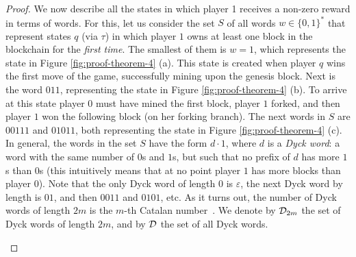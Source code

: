 \begin{proof}
We now describe all the states in which player 1 receives a non-zero reward in terms of words. For this, let us consider the set $S$ of all words $w \in \{0,1\}^*$ that represent states $q$ (via $\tau$) in which player $1$ owns at least one block in the blockchain for the {\em first time}. 
The smallest of them is $w = 1$, which represents the state in Figure \ref{fig:proof-theorem-4} (a). This state is created when player $q$ wins the first move of the game, successfully mining upon the genesis block. Next is the word $011$, representing the state in Figure \ref{fig:proof-theorem-4} (b). To arrive at this state player $0$ must have mined the first block, player $1$ forked, and then player $1$ 
won the following block (on her forking branch). The next words in $S$ are $00111$ and $01011$, both representing the state in Figure \ref{fig:proof-theorem-4} (c). 
In general, the words in the set $S$ have the form $d\cdot 1$, where $d$ is a \emph{Dyck word}: a word with the same number of $0$s and $1$s, but such that 
no prefix of $d$ has more $1$s than $0$s (this intuitively means that at no point player $1$ has more blocks than player $0$). Note that the only Dyck word of length $0$ is $\varepsilon$, the next Dyck word by length is $01$, and then $0011$ and $0101$, etc. As it turns out, the number of Dyck words of length $2m$ is the $m$-th Catalan number~\cite{stanley2015catalan}. We denote by $\Dyck_{2m}$ the set of Dyck words of length $2m$, and by $\Dyck$ the set of all Dyck words.

\begin{figure}
%
%
%
%
%	
%
%
%	
%	
%
\begin{center}
\begin{tikzpicture}[->,>=stealth',auto,thick, scale = 0.61,state/.style={circle,inner sep=2pt}]


\end{tikzpicture}
\end{center}
\end{figure}
\end{proof}
